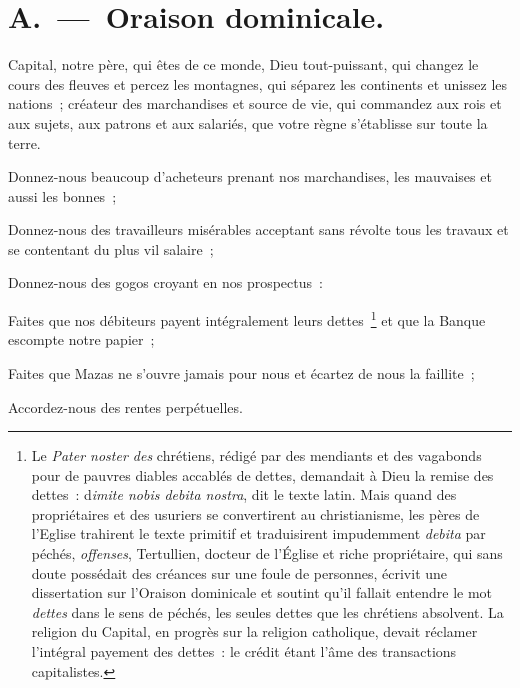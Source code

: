 \documentclass[french,twoside]{book} %
\begin{document}
\section[{A. — Oraison dominicale.}]{A. — Oraison dominicale.}
\noindent Capital, notre père, qui êtes de ce monde, Dieu tout-puissant, qui changez le cours des fleuves et percez les montagnes, qui séparez les continents et unissez les nations ; créateur des marchandises et source de vie, qui commandez aux rois et aux sujets, aux patrons et aux salariés, que votre règne s’établisse sur toute la terre.\par
Donnez-nous beaucoup d’acheteurs prenant nos marchandises, les mauvaises et aussi les bonnes ;\par
Donnez-nous des travailleurs misérables acceptant sans révolte tous les travaux et se contentant du plus vil salaire ;\par
Donnez-nous des gogos croyant en nos prospectus :\par
Faites que nos débiteurs payent intégralement leurs dettes \footnote{Le \emph{Pater noster des} chrétiens, rédigé par des mendiants et des vagabonds pour de pauvres diables accablés de dettes, demandait à Dieu la remise des dettes : d\emph{imite nobis debita nostra}, dit le texte latin. Mais quand des propriétaires et des usuriers se convertirent au christianisme, les pères de l’Eglise trahirent le texte primitif et traduisirent impudemment \emph{debita} par péchés, \emph{offenses}, Tertullien, docteur de l’Église et riche propriétaire, qui sans doute possédait des créances sur une foule de personnes, écrivit une dissertation sur l’Oraison dominicale et soutint qu’il fallait entendre le mot \emph{dettes} dans le sens de péchés, les seules dettes que les chrétiens absolvent. La religion du Capital, en progrès sur la religion catholique, devait réclamer l’intégral payement des dettes : le crédit étant l’âme des transactions capitalistes.} et que la Banque escompte notre papier ;\par
Faites que Mazas ne s’ouvre jamais pour nous et écartez de nous la faillite ;\par
Accordez-nous des rentes perpétuelles.\par

\begin{center}
\end{center}
\end{document}
